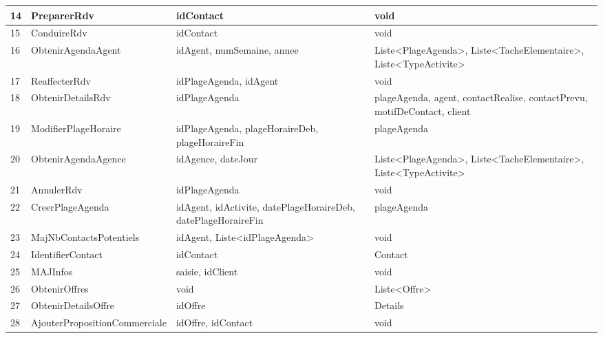 \begin{table}
{\begin{tabular}{p{1cm}|p{5cm}p{6cm}p{6cm}}
        14 & PreparerRdv                        & idContact                                                     & void\\ \hline
        15 & ConduireRdv                        & idContact                                                     & void\\ \hline
        16 & ObtenirAgendaAgent                 & idAgent, numSemaine, annee                                    & Liste<PlageAgenda>, Liste<TacheElementaire>, Liste<TypeActivite> \\ \hline
        17 & ReaffecterRdv                      & idPlageAgenda, idAgent                                        & void\\ \hline
        18 & ObtenirDetailsRdv                  & idPlageAgenda                                                 & plageAgenda, agent, contactRealise,  contactPrevu, motifDeContact, client\\ \hline
        19 & ModifierPlageHoraire               & idPlageAgenda, plageHoraireDeb, plageHoraireFin               & plageAgenda\\ \hline
        20 & ObtenirAgendaAgence                & idAgence, dateJour                                            & Liste<PlageAgenda>, Liste<TacheElementaire>,  Liste<TypeActivite>\\ \hline
        21 & AnnulerRdv                         & idPlageAgenda                                                 & void\\ \hline
        22 & CreerPlageAgenda                   & idAgent, idActivite, datePlageHoraireDeb, datePlageHoraireFin & plageAgenda\\ \hline
        23 & MajNbContactsPotentiels            & idAgent, Liste<idPlageAgenda>                                 & void\\ \hline
        24 & IdentifierContact                  & idContact                                                     & Contact\\ \hline
        25 & MAJInfos                           & saisie, idClient                                              & void\\ \hline
        26 & ObtenirOffres                      & void                                                          & Liste<Offre>\\ \hline
        27 & ObtenirDetailsOffre                & idOffre                                                       & Details\\ \hline
        28 & AjouterPropositionCommerciale      & idOffre, idContact                                            & void\\ \hline

\end{tabular}}
\end{table}
